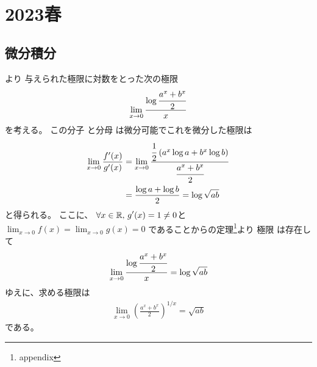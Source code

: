 \newpage
\section{2023春}

\subsection{微分積分}

\begin{ans*}
  より
  与えられた極限に対数をとった次の極限
  \begin{gather}
    \lim_{x\to 0} \frac{\log \cfrac{a^x + b^x}{2}}{x}
  \end{gather}
  を考える。
  この分子
  と分母
  は微分可能でこれを微分した極限は
  \begin{align}
    \lim_{x\to 0} \frac{f'(x)}{g'(x)}
    &=\lim_{x\to 0} \frac{\cfrac{1}{2}\;(a^x\log a+b^x\log b)}{\cfrac{a^x + b^x}{2}} \\
    &= \frac{\log a + \log b}{2} = \log \sqrt{ab}
  \end{align}
  と得られる。
  ここに、
  $\displaystyle\forall x\in\mathbb{R},\,\displaystyle g'(x) = 1 \neq 0 $と$ \lim_{x\to 0}f(x) = \lim_{x\to 0}g(x) = 0$
  であることから\lhopital の定理\footnote{appendix}より
  極限
  は存在して
  \begin{gather}
    \lim_{x\to 0} \frac{\log \cfrac{a^x + b^x}{2}}{x} = \log\sqrt{ab}
  \end{gather}
  ゆえに、求める極限は
  \begin{align}
    \lim_{x\to 0}\left(\frac{a^x+b^x}{2}\right)^{1/x}
     = \sqrt{ab}
  \end{align}
  である。
\end{ans*}

